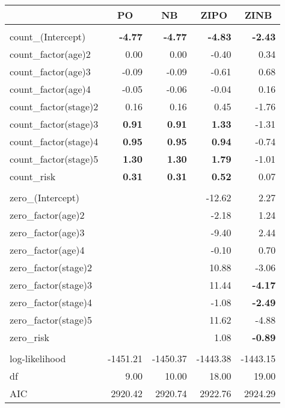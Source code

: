 \begin{table}[!tbp]
\begin{center}
\begin{tabular}{lrrrr}
\toprule
\multicolumn{1}{l}{}&\multicolumn{1}{c}{PO}&\multicolumn{1}{c}{NB}&\multicolumn{1}{c}{ZIPO}&\multicolumn{1}{c}{ZINB}\tabularnewline
\midrule
&&&&\tabularnewline
   count\_(Intercept)&\bfseries      -4.77&\bfseries      -4.77&\bfseries      -4.83&\bfseries      -2.43\tabularnewline
   count\_factor(age)2&       0.00&       0.00&      -0.40&       0.34\tabularnewline
   count\_factor(age)3&      -0.09&      -0.09&      -0.61&       0.68\tabularnewline
   count\_factor(age)4&      -0.05&      -0.06&      -0.04&       0.16\tabularnewline
   count\_factor(stage)2&       0.16&       0.16&       0.45&      -1.76\tabularnewline
   count\_factor(stage)3&\bfseries       0.91&\bfseries       0.91&\bfseries       1.33&      -1.31\tabularnewline
   count\_factor(stage)4&\bfseries       0.95&\bfseries       0.95&\bfseries       0.94&      -0.74\tabularnewline
   count\_factor(stage)5&\bfseries       1.30&\bfseries       1.30&\bfseries       1.79&      -1.01\tabularnewline
   count\_risk&\bfseries       0.31&\bfseries       0.31&\bfseries       0.52&       0.07\tabularnewline
\midrule
&&&&\tabularnewline
   zero\_(Intercept)&   &   &     -12.62&       2.27\tabularnewline
   zero\_factor(age)2&   &   &      -2.18&       1.24\tabularnewline
   zero\_factor(age)3&   &   &      -9.40&       2.44\tabularnewline
   zero\_factor(age)4&   &   &      -0.10&       0.70\tabularnewline
   zero\_factor(stage)2&   &   &      10.88&      -3.06\tabularnewline
   zero\_factor(stage)3&   &   &      11.44&\bfseries      -4.17\tabularnewline
   zero\_factor(stage)4&   &   &      -1.08&\bfseries      -2.49\tabularnewline
   zero\_factor(stage)5&   &   &      11.62&      -4.88\tabularnewline
   zero\_risk&   &   &       1.08&\bfseries      -0.89\tabularnewline
\midrule
&&&&\tabularnewline
   log-likelihood&   -1451.21&   -1450.37&   -1443.38&   -1443.15\tabularnewline
   df&       9.00&      10.00&      18.00&      19.00\tabularnewline
   AIC&    2920.42&    2920.74&    2922.76&    2924.29\tabularnewline
\bottomrule
\end{tabular}\end{center}

\end{table}
